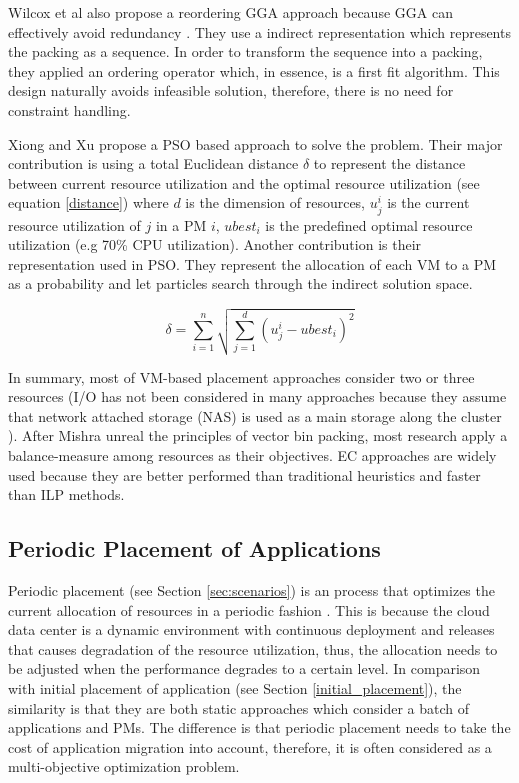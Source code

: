  Wilcox et al \cite{Wilcox:2011ea} also propose a reordering GGA approach because GGA can effectively avoid redundancy \cite{Falkenauer:1996hv}. They use a indirect representation \cite{Radcliffe:1991tp} which represents the packing as a sequence. In order to transform the sequence into a packing, they applied an ordering operator which, in essence, is a first fit algorithm. This design naturally avoids infeasible solution, therefore, there is no need for constraint handling. 


Xiong and Xu \cite{Xiong:2014jq} propose a PSO based approach to solve the problem. Their major contribution is using a total Euclidean distance $\delta$ to represent the distance between current resource utilization and the optimal resource utilization (see equation \ref{distance}) where $d$ is the dimension of resources, $u_j^i$ is the current resource utilization of $j$ in a PM $i$, $ubest_i$ is the predefined optimal resource utilization (e.g 70\% CPU utilization). Another contribution is their representation used in PSO. They represent the allocation of each VM to a PM as a probability and let particles search through the indirect solution space.

\begin{equation} \label{distance}
	\delta = \sum_{i=1}^n \sqrt{\sum_{j=1}^d (u_j^i - ubest_i)^2}
\end{equation}

In summary, most of VM-based placement approaches consider two or three resources (I/O has not been considered in many approaches because they assume that network attached storage (NAS) is used as a main storage along the cluster \cite{Murtazaev:2014eo}). After Mishra unreal the principles of vector bin packing, most research apply a balance-measure among resources as their objectives. EC approaches are widely used because they are better performed than traditional heuristics and faster than ILP methods.


\subsection{Periodic Placement of Applications}
Periodic placement (see Section \ref{sec:scenarios}) is an process that optimizes the current allocation of resources in a periodic fashion \cite{Mishra:2012kx}. This is because the cloud data center is a dynamic environment with continuous deployment and releases that causes degradation of the resource utilization, thus, the allocation needs to be adjusted when the performance degrades to a certain level. In comparison with initial placement of application (see Section \ref{initial_placement}), the similarity is that they are both static approaches which consider a batch of applications and PMs. The difference is that periodic placement needs to take the cost of application migration into account, therefore, it is often considered as a multi-objective optimization problem. 

